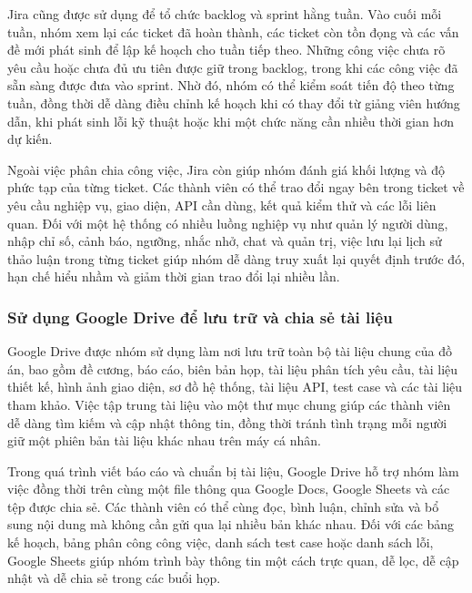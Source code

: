 \par Jira cũng được sử dụng để tổ chức backlog và sprint hằng tuần. Vào cuối mỗi tuần, nhóm xem lại các ticket đã hoàn thành, các ticket còn tồn đọng và các vấn đề mới phát sinh để lập kế hoạch cho tuần tiếp theo. Những công việc chưa rõ yêu cầu hoặc chưa đủ ưu tiên được giữ trong backlog, trong khi các công việc đã sẵn sàng được đưa vào sprint. Nhờ đó, nhóm có thể kiểm soát tiến độ theo từng tuần, đồng thời dễ dàng điều chỉnh kế hoạch khi có thay đổi từ giảng viên hướng dẫn, khi phát sinh lỗi kỹ thuật hoặc khi một chức năng cần nhiều thời gian hơn dự kiến.

\par Ngoài việc phân chia công việc, Jira còn giúp nhóm đánh giá khối lượng và độ phức tạp của từng ticket. Các thành viên có thể trao đổi ngay bên trong ticket về yêu cầu nghiệp vụ, giao diện, API cần dùng, kết quả kiểm thử và các lỗi liên quan. Đối với một hệ thống có nhiều luồng nghiệp vụ như quản lý người dùng, nhập chỉ số, cảnh báo, ngưỡng, nhắc nhở, chat và quản trị, việc lưu lại lịch sử thảo luận trong từng ticket giúp nhóm dễ dàng truy xuất lại quyết định trước đó, hạn chế hiểu nhầm và giảm thời gian trao đổi lại nhiều lần.

\subsubsection{Sử dụng Google Drive để lưu trữ và chia sẻ tài liệu}
\par Google Drive được nhóm sử dụng làm nơi lưu trữ toàn bộ tài liệu chung của đồ án, bao gồm đề cương, báo cáo, biên bản họp, tài liệu phân tích yêu cầu, tài liệu thiết kế, hình ảnh giao diện, sơ đồ hệ thống, tài liệu API, test case và các tài liệu tham khảo. Việc tập trung tài liệu vào một thư mục chung giúp các thành viên dễ dàng tìm kiếm và cập nhật thông tin, đồng thời tránh tình trạng mỗi người giữ một phiên bản tài liệu khác nhau trên máy cá nhân.

\par Trong quá trình viết báo cáo và chuẩn bị tài liệu, Google Drive hỗ trợ nhóm làm việc đồng thời trên cùng một file thông qua Google Docs, Google Sheets và các tệp được chia sẻ. Các thành viên có thể cùng đọc, bình luận, chỉnh sửa và bổ sung nội dung mà không cần gửi qua lại nhiều bản khác nhau. Đối với các bảng kế hoạch, bảng phân công công việc, danh sách test case hoặc danh sách lỗi, Google Sheets giúp nhóm trình bày thông tin một cách trực quan, dễ lọc, dễ cập nhật và dễ chia sẻ trong các buổi họp.

